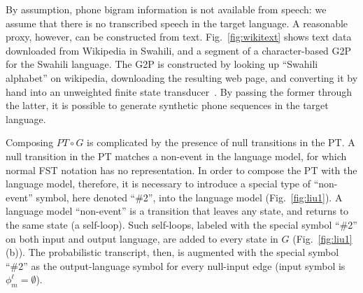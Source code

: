 By assumption, phone bigram information is not available from speech:
we assume that there is no transcribed speech in the target language.
A reasonable proxy, however, can be constructed from text.
Fig.~\ref{fig:wikitext} shows text data downloaded from Wikipedia in
Swahili, and a segment of a character-based G2P for the Swahili
language.  {\color{blue} The G2P is constructed by looking up
  ``Swahili alphabet'' on wikipedia, downloading the resulting web
  page, and converting it by hand into an unweighted finite state
  transducer~\cite{Hasegawajohnson15}.}  By passing the former through
the latter, it is possible to generate synthetic phone sequences in
the target language.

Composing $PT\circ G$ is complicated by the presence of null
transitions in the PT.  A null transition in the PT matches a
non-event in the language model, for which normal FST notation has no
representation. In order to compose the PT with the language model,
therefore, it is necessary to introduce a special type of
``non-event'' symbol, here denoted ``\#2'', into the language model
(Fig.~\ref{fig:liu1}).  A language
model ``non-event'' is a transition that leaves any state, and returns
to the same state (a self-loop).  Such self-loops, labeled with the
special symbol ``\#2'' on both input and output language, are added to
every state in $G$ (Fig.~\ref{fig:liu1} (b)).
The probabilistic transcript, then, is
augmented with the special symbol ``\#2'' as the output-language symbol
for every null-input edge (input symbol is $\phi_m^\ell =\emptyset$).
